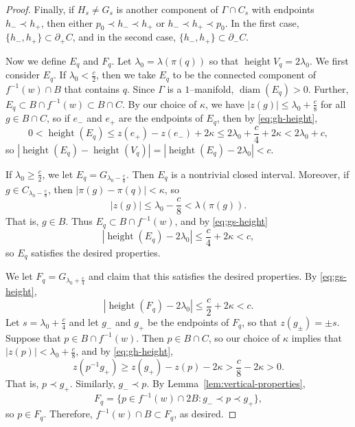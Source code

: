 \documentclass[12pt,reqno]{amsart}
\DeclareMathOperator{\height}{height}
\theoremstyle{remark}
\newcommand{\0}{\mathbf{0}}
\renewcommand{\1}{\mathbf 1}
\DeclareMathOperator{\diam}{diam}
\begin{document}
\begin{proof}
  Finally, if $H_s\ne G_s$ is another component of $\Gamma\cap C_s$ with endpoints $h_-\prec h_+$, then either $p_0 \prec h_- \prec h_+$ or $h_- \prec h_+\prec p_0$. In the first case, $\{h_-,h_+\}\subset \partial_+ C$, and in the second case, $\{h_-,h_+\}\subset \partial_- C$. 

  Now we define $E_q$ and $F_q$. Let $\lambda_0 = \lambda(\pi(q))$ so that $\height V_q=2\lambda_0$. We first consider $E_q$. If $\lambda_0 < \frac{c}{2}$, then we take $E_q$ to be the connected component of $f^{-1}(w)\cap B$ that contains $q$. Since $\Gamma$ is a $1$--manifold, $\diam (E_q)>0$. Further, $E_q \subset B\cap f^{-1}(w)\subset B\cap C$. By our choice of $\kappa$, we have $|z(g)| \le \lambda_0 + \frac{c}{8}$ for all $g\in B\cap C$, so if $e_-$ and $e_+$ are the endpoints of $E_q$, then by \eqref{eq:gh-height},
  $$0 < \height(E_q) \le z(e_+) - z(e_-) + 2\kappa \le 2\lambda_0 + \frac{c}{4} + 2\kappa < 2\lambda_0 + c,$$
  so $|\height(E_q) - \height(V_q)| = |\height(E_q) - 2\lambda_0| < c.$

  If $\lambda_0 \ge \frac{c}{2}$, we let $E_q=G_{\lambda_0 - \frac{c}{8}}$. Then $E_q$ is a nontrivial closed interval. Moreover, if $g\in C_{\lambda_0 - \frac{c}{8}}$, then $|\pi(g) - \pi(q)| < \kappa$, so
  $$|z(g)| \le \lambda_0 - \frac{c}{8} < \lambda(\pi(g)).$$
  That is, $g\in B$. 
  Thus $E_q\subset B \cap f^{-1}(w)$, and by \eqref{eq:gs-height}
  $$|\height(E_q) - 2\lambda_0| \le \frac{c}{4}+2\kappa < c,$$
  so $E_q$ satisfies the desired properties.

  We let $F_q = G_{\lambda_0 + \frac{c}{4}}$ and claim that this satisfies the desired properties.   By \eqref{eq:gs-height}, 
  $$|\height(F_q) - 2\lambda_0| \le \frac{c}{2}+2\kappa < c.$$
  Let $s=\lambda_0 + \frac{c}{4}$ and let $g_-$ and $g_+$ be the endpoints of $F_q$, so that $z(g_\pm) = \pm s$. Suppose that $p\in B\cap f^{-1}(w)$. Then $p \in B\cap C$, so our choice of $\kappa$ implies that $|z(p)| < \lambda_0 + \frac{c}{8}$, and by \eqref{eq:gh-height},
  $$z(p^{-1} g_+) \ge z(g_+) - z(p) - 2\kappa > \frac{c}{8} - 2\kappa > 0.$$
  That is, $p \prec g_+$. Similarly, $g_- \prec p$. By Lemma~\ref{lem:vertical-properties},
  $$F_q = \{p \in f^{-1}(w) \cap 2B : g_- \prec p \prec g_+\},$$
  so $p\in F_q$. Therefore, $f^{-1}(w)\cap B\subset F_q$, as desired.
\end{proof}
\end{document}
